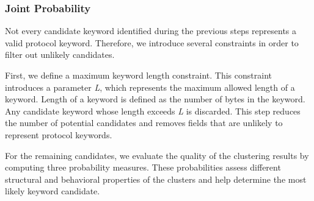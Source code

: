 \subsubsection{Joint Probability}

Not every candidate keyword identified during the previous steps represents a valid protocol keyword. Therefore, we introduce several constraints in order to filter out unlikely candidates. 

First, we define a maximum keyword length constraint. This constraint introduces a parameter \textit{L}, which represents the maximum allowed length of a keyword. Length of a keyword is defined as the number of bytes in the keyword. Any candidate keyword whose length exceeds \textit{L} is discarded. This step reduces the number of potential candidates and removes fields that are unlikely to represent protocol keywords.

For the remaining candidates, we evaluate the quality of the clustering results by computing three probability measures. These probabilities assess different structural and behavioral properties of the clusters and help determine the most likely keyword candidate.


